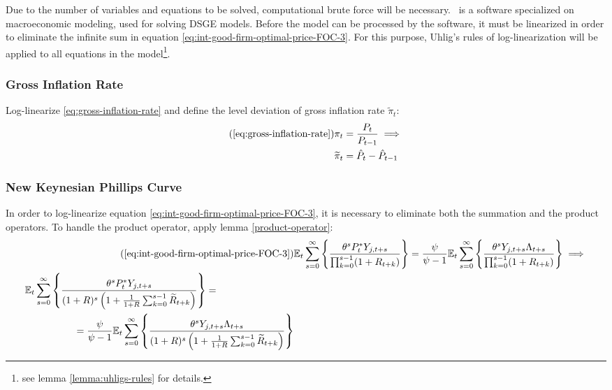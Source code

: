\documentclass[
	thesis.tex
	]{subfiles}
\begin{document}
Due to the number of variables and equations to be solved, computational brute force will be necessary. \dynare \ is a software specialized on macroeconomic modeling, used for solving DSGE models. Before the model can be processed by the software, it must be linearized in order to eliminate the infinite sum in equation \ref{eq:int-good-firm-optimal-price-FOC-3}. For this purpose, Uhlig's rules of log-linearization \cite{uhlig_toolkit_1999} will be applied to all equations in the model\footnote{see lemma \ref{lemma:uhligs-rules} for details.}.


\subsubsection{Gross Inflation Rate}

Log-linearize \ref{eq:gross-inflation-rate} and define the level deviation of gross inflation rate $\widetilde{\pi}_t$:
\begin{align}
	\tag{\ref{eq:gross-inflation-rate}}
	\pi_t &= \frac{P_t}{P_{t-1}} \implies \\
	\widetilde{\pi}_t &= \hat{P}_t - \hat{P}_{t-1}
	\label{eq:level-dev-gross-inflation-rate}
\end{align}


\subsubsection{New Keynesian Phillips Curve}

In order to log-linearize equation \ref{eq:int-good-firm-optimal-price-FOC-3}, it is necessary to eliminate both the summation and the product operators. To handle the product operator, apply lemma \ref{product-operator}:
\begin{align}
	\tag{\ref{eq:int-good-firm-optimal-price-FOC-3}}
	& \E \sum_{s=0}^{\infty} \left\{ \frac{\theta^s P_t^\ast Y_{j,t+s} }{ \prod_{k=0}^{s-1}(1+R_{t+k})} \right\} = \frac{\psi}{\psi-1} \E \sum_{s=0}^{\infty} \left\{ \frac{\theta^s Y_{j,t+s} \Lambda_{t+s}}{\prod_{k=0}^{s-1}(1+R_{t+k})} \right\} \implies
	\\
	\begin{split}
		& \E \sum_{s=0}^{\infty} \left\{ \frac{\theta^s P_t^\ast Y_{j,t+s}}{ (1 + R)^s \left( 1 + \frac{1}{1 + R} \sum_{k=0}^{s-1} \widetilde{R}_{t+k} \right) } \right\} = 
		\\ & \quad \quad \quad \quad \quad = \frac{\psi}{\psi-1} \E \sum_{s=0}^{\infty} \left\{ \frac{\theta^s Y_{j,t+s} \Lambda_{t+s}}{ (1 + R)^s \left( 1 + \frac{1}{1 + R} \sum_{k=0}^{s-1} \widetilde{R}_{t+k} \right) } \right\} \label{eq:ll-optimal-price}
	\end{split}
\end{align}
\end{document}
